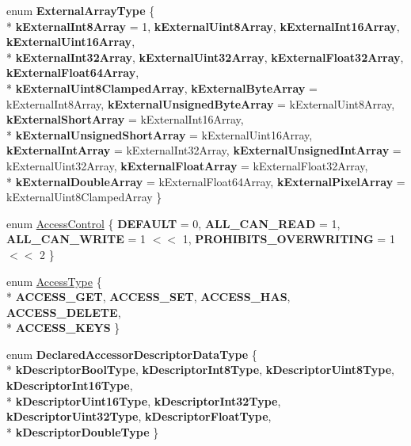 \begin{DoxyCompactItemize}
\item 
\hypertarget{namespacev8_aabbbc5430374565be119ff192a40544e}{}enum {\bfseries External\+Array\+Type} \{ \\*
{\bfseries k\+External\+Int8\+Array} = 1, 
{\bfseries k\+External\+Uint8\+Array}, 
{\bfseries k\+External\+Int16\+Array}, 
{\bfseries k\+External\+Uint16\+Array}, 
\\*
{\bfseries k\+External\+Int32\+Array}, 
{\bfseries k\+External\+Uint32\+Array}, 
{\bfseries k\+External\+Float32\+Array}, 
{\bfseries k\+External\+Float64\+Array}, 
\\*
{\bfseries k\+External\+Uint8\+Clamped\+Array}, 
{\bfseries k\+External\+Byte\+Array} = k\+External\+Int8\+Array, 
{\bfseries k\+External\+Unsigned\+Byte\+Array} = k\+External\+Uint8\+Array, 
{\bfseries k\+External\+Short\+Array} = k\+External\+Int16\+Array, 
\\*
{\bfseries k\+External\+Unsigned\+Short\+Array} = k\+External\+Uint16\+Array, 
{\bfseries k\+External\+Int\+Array} = k\+External\+Int32\+Array, 
{\bfseries k\+External\+Unsigned\+Int\+Array} = k\+External\+Uint32\+Array, 
{\bfseries k\+External\+Float\+Array} = k\+External\+Float32\+Array, 
\\*
{\bfseries k\+External\+Double\+Array} = k\+External\+Float64\+Array, 
{\bfseries k\+External\+Pixel\+Array} = k\+External\+Uint8\+Clamped\+Array
 \}\label{namespacev8_aabbbc5430374565be119ff192a40544e}

\item 
enum \hyperlink{namespacev8_a31d8355cb043d7d2dda3f4a52760b64e}{Access\+Control} \{ {\bfseries D\+E\+F\+A\+U\+L\+T} = 0, 
{\bfseries A\+L\+L\+\_\+\+C\+A\+N\+\_\+\+R\+E\+A\+D} = 1, 
{\bfseries A\+L\+L\+\_\+\+C\+A\+N\+\_\+\+W\+R\+I\+T\+E} = 1 $<$$<$ 1, 
{\bfseries P\+R\+O\+H\+I\+B\+I\+T\+S\+\_\+\+O\+V\+E\+R\+W\+R\+I\+T\+I\+N\+G} = 1 $<$$<$ 2
 \}
\item 
enum \hyperlink{namespacev8_add8bef6469c5b94706584124e610046c}{Access\+Type} \{ \\*
{\bfseries A\+C\+C\+E\+S\+S\+\_\+\+G\+E\+T}, 
{\bfseries A\+C\+C\+E\+S\+S\+\_\+\+S\+E\+T}, 
{\bfseries A\+C\+C\+E\+S\+S\+\_\+\+H\+A\+S}, 
{\bfseries A\+C\+C\+E\+S\+S\+\_\+\+D\+E\+L\+E\+T\+E}, 
\\*
{\bfseries A\+C\+C\+E\+S\+S\+\_\+\+K\+E\+Y\+S}
 \}
\item 
\hypertarget{namespacev8_a47404d60b87c3c91bc10d46f1ff871ff}{}enum {\bfseries Declared\+Accessor\+Descriptor\+Data\+Type} \{ \\*
{\bfseries k\+Descriptor\+Bool\+Type}, 
{\bfseries k\+Descriptor\+Int8\+Type}, 
{\bfseries k\+Descriptor\+Uint8\+Type}, 
{\bfseries k\+Descriptor\+Int16\+Type}, 
\\*
{\bfseries k\+Descriptor\+Uint16\+Type}, 
{\bfseries k\+Descriptor\+Int32\+Type}, 
{\bfseries k\+Descriptor\+Uint32\+Type}, 
{\bfseries k\+Descriptor\+Float\+Type}, 
\\*
{\bfseries k\+Descriptor\+Double\+Type}
 \}\label{namespacev8_a47404d60b87c3c91bc10d46f1ff871ff}


\end{DoxyCompactItemize}
